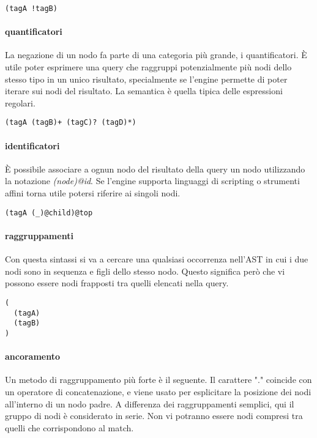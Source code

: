 \begin{lstlisting}
(tagA !tagB)
\end{lstlisting}

\paragraph{quantificatori}

La negazione di un nodo fa parte di una categoria pi\`u grande, i quantificatori.
\`E utile poter esprimere una query che raggruppi potenzialmente pi\`u nodi dello stesso tipo in un unico risultato, specialmente se l'engine permette di poter iterare sui nodi del risultato.
La semantica \`e quella tipica delle espressioni regolari.

\begin{lstlisting}
(tagA (tagB)+ (tagC)? (tagD)*)
\end{lstlisting}

\paragraph{identificatori}

\`E possibile associare a ognun nodo del risultato della query un nodo utilizzando la notazione \emph{(node)@id}.
Se l'engine supporta linguaggi di scripting o strumenti affini torna utile potersi riferire ai singoli nodi.

\begin{lstlisting}
(tagA (_)@child)@top
\end{lstlisting}

\paragraph{raggruppamenti}

Con questa sintassi si va a cercare una qualsiasi occorrenza nell'AST in cui i due nodi sono in sequenza e figli dello stesso nodo.
Questo significa per\`o che vi possono essere nodi frapposti tra quelli elencati nella query.

\begin{lstlisting}
(
  (tagA)
  (tagB)
)
\end{lstlisting}

\paragraph{ancoramento}

Un metodo di raggruppamento pi\`u forte \`e il seguente.
Il carattere "." coincide con un operatore di concatenazione, e viene usato per esplicitare la posizione dei nodi all'interno di un nodo padre.
A differenza dei raggruppamenti semplici, qui il gruppo di nodi \`e considerato in serie.
Non vi potranno essere nodi compresi tra quelli che corrispondono al match.

